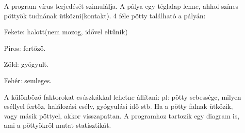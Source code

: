A program vírus terjedését szimulálja. A pálya egy téglalap lenne, ahhol színes pöttyök tudnának ütközni(kontakt). 4 féle pötty található a pályán\+:


\begin{DoxyItemize}
\item Fekete\+: halott(nem mozog, idővel eltűnik)
\item Piros\+: fertőző.
\item Zöld\+: gyógyult.
\item Fehér\+: semleges.
\end{DoxyItemize}

A különböző faktorokat csúszkákkal lehetne állítani\+: pl\+: pötty sebessége, milyen eséllyel fertőz, halálozási esély, gyógyulási idő stb. Ha a pötty falnak ütközik, vagy másik pöttyel, akkor visszapattan. A programhoz tartozik egy diagram is, ami a pöttyökről mutat statisztikát. 